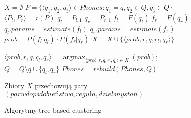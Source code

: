 \documentclass[shortabstract, mgr]{iithesis}
\DeclareMathOperator*{\argmax}{\arg\max}   %
\begin{document}
	\begin{figure}
		\begin{algorithmic}[1]
			
			
				\STATE $X = \emptyset \label{line:iter_begin}$
					\STATE $P = \Big\{\langle q_1, q_2, q_3\rangle \in Phones: q_1 = q, q_2 \in Q, q_3 \in Q\Big\}$
						\STATE $\langle P_l, P_r \rangle = r(P)$			
						\STATE $q_l = P_{l,1}$
						\STATE $q_r = P_{r,1}$
						\STATE $f_l = F(q_l)$ \label{line:f_l}
						\STATE $f_r = F(q_r)$ \label{line:f_r}
							\STATE $q_l.params = estimate(f_l)$
							\STATE $q_r.params = estimate(f_r)$
								\STATE $prob = P(f_l | q_l) \cdot P(f_r | q_r)$
								\STATE $X = X \cup \{\langle prob, r, q, r_l, q_r\rangle\}$ \label{line:r_prob}
							\ENDIF
						\ENDIF
					\ENDFOR
				\ENDFOR \label{line:iter_end}
				
					
					\STATE $\langle prob, r, q, q_l, q_r\rangle = \argmax_{\langle prob, r, q, r_l, q_r\rangle\in X}(prob)$;
					\STATE $Q = Q \setminus {q} \cup \{q_l, q_r\} \label{line:q_ext}$
					\STATE $Phones = rebuild(Phones, Q)\label{line:p_eqt}$
				\ELSE
				\ENDIF
			\ENDWHILE
		\end{algorithmic}
		
		Zbiory $X$ przechowują pary $(parwdopodobieństwo, reguła, dzielony stan)$ 
		
		\caption{Algorytmy tree-based clustering}
		\label{alg:tree_based_clustering}
	\end{figure}
\end{document}
